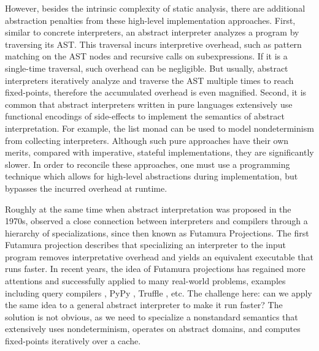 However, besides the intrinsic complexity of static analysis, there are
additional abstraction penalties from these high-level implementation
approaches. First, similar to concrete interpreters, an abstract interpreter
analyzes a program by traversing its AST. This traversal incurs
interpretive overhead, such as pattern matching on the AST nodes and recursive
calls on subexpressions. If it is a single-time traversal, such overhead can be
negligible. But usually, abstract interpreters iteratively analyze and traverse
the AST multiple times to reach fixed-points, therefore the accumulated
overhead is even magnified. 
Second, it is common that abstract interpreters written in pure languages
extensively use functional encodings of side-effects to implement the semantics
of abstract interpretation.  For example, the list monad can be used to model
nondeterminism from collecting interpreters.
Although such pure approaches have their own merits, compared with imperative,
stateful implementations, they are significantly slower.  In order to
reconcile these approaches, one must use a programming technique which allows
for high-level abstractions during implementation, but bypasses the
incurred overhead at runtime.

Roughly at the same time when abstract interpretation was proposed in the
1970s, \citet{futamura1971partial} observed a close
connection between interpreters and compilers through a hierarchy of
specializations, since then known as Futamura Projections. The first Futamura
projection describes that specializing an interpreter to the input program
removes interpretative overhead and yields an equivalent executable
that runs faster. 
In recent years, the idea of Futamura projections has regained more attentions
and successfully applied to many real-world problems, examples including
query compilers \cite{DBLP:conf/sigmod/TahboubER18}, PyPy \cite{Bolz:2009:TMP:1565824.1565827},
Truffle \cite{Marr:2015:TVP:2814270.2814275}, etc.
The challenge here: can we apply the same idea to a general abstract interpreter
to make it run faster? The solution is not obvious, as we need to specialize
a nonstandard semantics that extensively uses nondeterminism, operates on
abstract domains, and computes fixed-points iteratively over a cache. 

